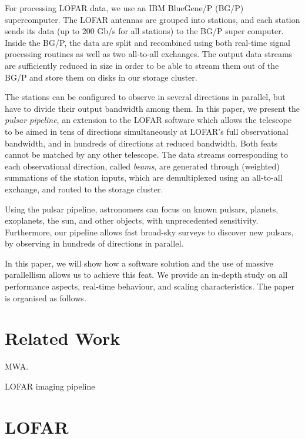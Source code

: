 \documentclass{llncs}
\begin{document}
For processing LOFAR data, we use an IBM BlueGene/P (BG/P) supercomputer. The LOFAR antennas are grouped into stations, and each station sends its data (up to 200 Gb/s for all stations) to the BG/P super computer. Inside the BG/P, the data are split and recombined using both real-time signal processing routines as well as two all-to-all exchanges. The output data streams are sufficiently reduced in size in order to be able to stream them out of the BG/P and store them on disks in our storage cluster.

The stations can be configured to observe in several directions in parallel, but have to divide their output bandwidth among them. In this paper, we present the \emph{pulsar pipeline}, an extension to the LOFAR software which allows the telescope to be aimed in tens of directions simultaneously at LOFAR's full observational bandwidth, and in hundreds of directions at reduced bandwidth. Both feats cannot be matched by any other telescope. The data streams corresponding to each observational direction, called \emph{beams}, are generated through (weighted) summations of the station inputs, which are demultiplexed using an all-to-all exchange, and routed to the storage cluster.

Using the pulsar pipeline, astronomers can focus on known pulsars, planets, exoplanets, the sun, and other objects, with unprecedented sensitivity. Furthermore, our pipeline allows fast broad-sky surveys to discover new pulsars, by observing in hundreds of directions in parallel. 


In this paper, we will show how a software solution and the use of massive parallellism allows us to achieve this feat. We provide an in-depth study on all performance aspects, real-time behaviour, and scaling characteristics. The paper is organised as follows.

\section{Related Work}

MWA.

LOFAR imaging pipeline \cite{Romein:10a}

\section{LOFAR}
\label{Sec:LOFAR}
\end{document}
